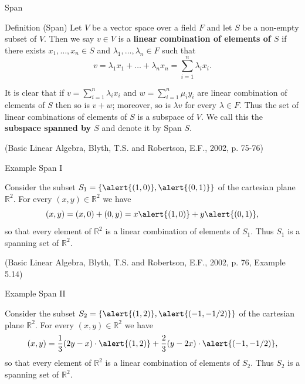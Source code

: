 \documentclass{beamer}
\begin{document}
\begin{frame}{Span}
    \begin{block}{Definition (Span)}
        Let $V$ be a vector space over a field $F$ and let $S$ be a non-empty subset of $V$. Then we say $v \in V$ is a \textbf{linear combination of elements of $S$} if there exists $x_1, \dots, x_n \in S$ and $\lambda_1, \dots , \lambda_n \in F$ such that
        $$v = \lambda_1 x_1 + \dots + \lambda_n x_n = \sum_{i=1}^{n} \lambda_i x_i.$$
        
        It is clear that if $v = \sum_{i=1}^{n} \lambda_i x_i$ and $w = \sum_{i=1}^{n} \mu_i y_i$ are linear combination of elements of $S$ then so is $v + w$; moreover, so is $\lambda v$ for every $\lambda \in F$. Thus the set of linear combinations of elements of $S$ is a subspace of $V$. We call this the \textbf{subspace spanned by $S$} and denote it by \alert{Span $S$}.

        \par \vspace{3mm} (Basic Linear Algebra, Blyth, T.S. and Robertson, E.F., 2002, p. 75-76)
    \end{block}
\end{frame}

\begin{frame}{Example Span I}
    \begin{example}
        Consider the subset $S_1 = \{\alert{(1,0)}, \alert{(0,1)}\}$ of the cartesian plane $\mathbb{R}^2$. For every $(x,y) \in \mathbb{R}^2$ we have
        $$(x,y) = (x,0) + (0,y) = x\alert{(1,0)} + y\alert{(0,1)},$$
        so that every element of $\mathbb{R}^2$ is a linear combination of elements of $S_1$. Thus $S_1$ is a spanning set of $\mathbb{R}^2$.
        \par \vspace{3mm} (Basic Linear Algebra, Blyth, T.S. and Robertson, E.F., 2002, p. 76, Example 5.14)
    \end{example}
\end{frame}

\begin{frame}{Example Span II}
    \begin{example}
        Consider the subset $S_2 = \{\alert{(1,2)}, \alert{(-1,-1/2)}\}$ of the cartesian plane $\mathbb{R}^2$. For every $(x,y) \in \mathbb{R}^2$ we have
        $$(x,y) = \frac 1 3 (2y - x) \cdot \alert{(1,2)} + \frac 2 3 (y - 2x) \cdot \alert{(-1, -1/2)},$$
        so that every element of $\mathbb{R}^2$ is a linear combination of elements of $S_2$. Thus $S_2$ is a spanning set of $\mathbb{R}^2$.
    \end{example}
\end{frame}
\end{document}
